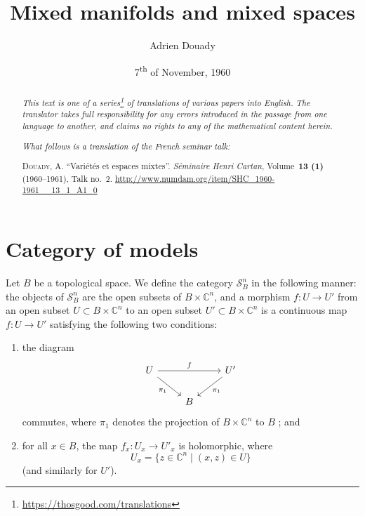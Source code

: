 \documentclass{article}
\title{Mixed manifolds and mixed spaces}
\author{Adrien Douady}
\date{7\textsuperscript{th} of November, 1960}
\newcommand{\doctype}{French seminar talk}
\newcommand{\origcit}{%
  \textsc{Douady, A.}
  ``Vari\'{e}t\'{e}s et espaces mixtes''.
  \emph{S\'{e}minaire Henri Cartan}, Volume~\textbf{13 (1)} (1960--1961), Talk no.~2.
  {\url{http://www.numdam.org/item/SHC_1960-1961__13_1_A1_0}}%
}
\theoremstyle{plain}
\theoremstyle{definition}
\newcommand{\CC}{\mathbb{C}}
\newcommand{\oldpage}[1]{\marginpar{\footnotesize$\Big\vert$ \textit{p.~#1}}}
\begin{document}
\maketitle
\thispagestyle{fancy}

\renewcommand{\abstractname}{Translator's note.}

\begin{abstract}
  \renewcommand*{\thefootnote}{\fnsymbol{footnote}}
  \emph{This text is one of a series\footnote{\url{https://thosgood.com/translations}} of translations of various papers into English.}
  \emph{The translator takes full responsibility for any errors introduced in the passage from one language to another, and claims no rights to any of the mathematical content herein.}

  \medskip
  
  \emph{What follows is a translation of the \doctype:}

  \medskip\noindent
  \origcit
\end{abstract}

\setcounter{footnote}{0}

\tableofcontents
\bigskip



\section{Category of models}
\label{I}

\oldpage{2-01}
Let $B$ be a topological space.
We define the category $\mathscr{S}_B^n$ in the following manner: the objects of $\mathscr{S}_B^n$ are the open subsets of $B\times\CC^n$, and a morphism $f\colon U\to U'$ from an open subset $U\subset B\times\CC^n$ to an open subset $U'\subset B\times\CC^n$ is a continuous map $f\colon U\to U'$ satisfying the following two conditions:
\begin{enumerate}
  \item the diagram
    \[
      \begin{tikzcd}
        U \ar[rr,"f"] \ar[dr,swap,"\pi_1"]
        && U' \ar[dl,"\pi_1"]
      \\&B&
      \end{tikzcd}
    \]
    commutes, where $\pi_1$ denotes the projection of $B\times\CC^n$ to $B$ ; and
  \item for all $x\in B$, the map $f_x\colon U_x\to U'_x$ is holomorphic, where
    \[
      U_x = \{z\in\CC^n \mid (x,z)\in U\}
    \]
    (and similarly for $U'$).
\end{enumerate}
\end{document}
